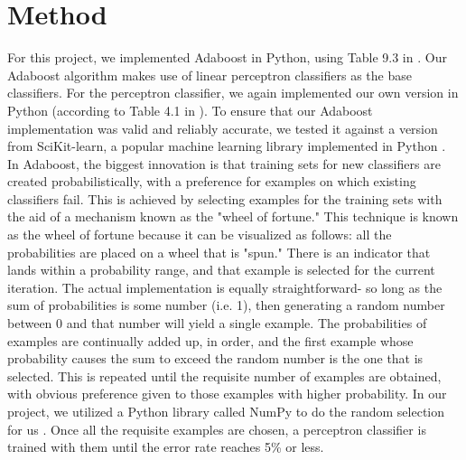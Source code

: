 \documentclass{article}
\begin{document}
\section{Method}

For this project, we implemented Adaboost in Python, using Table 9.3 in \cite{kubat}. Our Adaboost algorithm makes use of linear perceptron classifiers as the base classifiers. For the perceptron classifier, we again implemented our own version in Python (according to Table 4.1 in \cite{kubat}). To ensure that our Adaboost implementation was valid and reliably accurate, we tested it against a version from SciKit-learn, a popular machine learning library implemented in Python \cite{scikit}. \\

In Adaboost, the biggest innovation is that training sets for new classifiers are created probabilistically, with a preference for examples on which existing classifiers fail. This is achieved by selecting examples for the training sets with the aid of a mechanism known as the "wheel of fortune." This technique is known as the wheel of fortune because it can be visualized as follows: all the probabilities are placed on a wheel that is "spun." There is an indicator that lands within a probability range, and that example is selected for the current iteration. The actual implementation is equally straightforward- so long as the sum of probabilities is some number (i.e. 1), then generating a random number between 0 and that number will yield a single example. The probabilities of examples are continually added up, in order, and the first example whose probability causes the sum to exceed the random number is the one that is selected. This is repeated until the requisite number of examples are obtained, with obvious preference given to those examples with higher probability. In our project, we utilized a Python library called NumPy to do the random selection for us \cite{numpy}. Once all the requisite examples are chosen, a perceptron classifier is trained with them until the error rate reaches 5\% or less. \\
\end{document}
